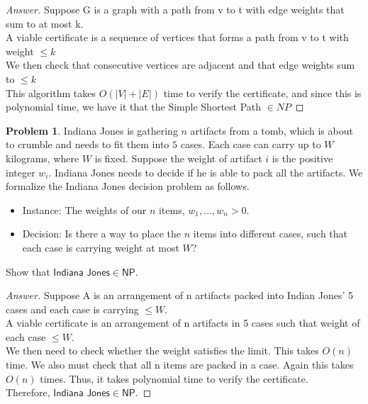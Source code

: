 \documentclass[11pt]{article}
\theoremstyle{definition}
\theoremstyle{definition}
\newtheorem{required}{Problem}
\theoremstyle{definition}
\begin{document}
\begin{proof}[Answer]
Suppose G is a graph with a path from v to t with edge weights that sum to at most k. \\
A viable certificate is a sequence of vertices that forms a path from v to t with weight $\le k$\\
We then check that consecutive vertices are adjacent and that edge weights sum to  $\le k$\\
This algorithm takes $O(|V| + |E|)$ time to verify the certificate, and since this is polynomial time, we have it that the Simple Shortest Path $\in NP$
\end{proof}

\newpage
\begin{required} 
Indiana Jones is gathering $n$ artifacts from a tomb, which is about to crumble and needs to fit them into $5$ cases. Each case can carry up to $W$ kilograms, where $W$ is fixed. Suppose the weight of artifact $i$ is the positive integer $w_{i}$. Indiana Jones needs to decide if he is able to pack all the artifacts. We formalize the \textsf{Indiana Jones} decision problem as follows.
\begin{itemize}
\item \textsf{Instance:} The weights of our $n$ items, $w_{1}, \ldots, w_{n} > 0$. 
\item \textsf{Decision:} Is there a way to place the $n$ items into different cases, such that each case is carrying weight at most $W$?
\end{itemize}

\noindent Show that $\textsf{Indiana Jones} \in \textsf{NP}.$
\end{required}

\begin{proof}[Answer]
Suppose A is an arrangement of n artifacts packed into Indian Jones' 5 cases and each case is carrying $\leq W$. \\
A viable certificate is an arrangement of n artifacts in 5 cases such that weight of each case $\leq W$. \\
We then need to check whether the weight satisfies the limit. This takes $O(n)$ time.  We also must check that all n items are packed in a case. Again this takes $O(n)$ times. Thus, it takes polynomial time to verify the certificate. \\
Therefore,  $\textsf{Indiana Jones} \in \textsf{NP}.$

\end{proof}
\end{document}
